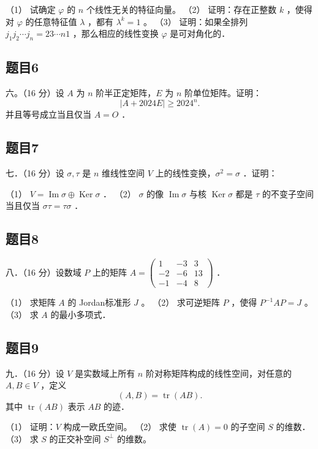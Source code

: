 \documentclass{article}
\begin{document}
（1） 试确定 \(\varphi\) 的 \(n\) 个线性无关的特征向量。
（2） 证明：存在正整数 \(k\) ，使得对 \(\varphi\) 的任意特征值 \(\lambda\) ，都有 \(\lambda^{k}=1\) 。
（3） 证明：如果全排列 \(j_{1} j_{2} \cdots j_{n}=23 \cdots n 1\) ，那么相应的线性变换 \(\varphi\) 是可对角化的．

\subsection{题目6}
六。（16 分）设 \(A\) 为 \(n\) 阶半正定矩阵，\(E\) 为 \(n\) 阶单位矩阵。证明：
\[
|A+2024 E| \geq 2024^{n} .
\]
并且等号成立当且仅当 \(A=O\) ．

\subsection{题目7}
七．（16 分）设 \(\sigma, \tau\) 是 \(n\) 维线性空间 \(V\) 上的线性变换，\(\sigma^{2}=\sigma\) ．证明：

（1） \(V=\operatorname{Im} \sigma \oplus \operatorname{Ker} \sigma\) ．
（2） \(\sigma\) 的像 \(\operatorname{Im} \sigma\) 与核 \(\operatorname{Ker} \sigma\) 都是 \(\tau\) 的不变子空间当且仅当 \(\sigma \tau=\tau \sigma\) ．

\subsection{题目8}
八．（16 分）设数域 \(P\) 上的矩阵 \(A=\left(\begin{array}{ccc}1 & -3 & 3 \\ -2 & -6 & 13 \\ -1 & -4 & 8\end{array}\right)\) ．

（1） 求矩阵 \(A\) 的 Jordan标准形 \(J\) 。
（2） 求可逆矩阵 \(P\) ，使得 \(P^{-1} A P=J\) 。
（3） 求 \(A\) 的最小多项式．

\subsection{题目9}
九．（16 分）设 \(V\) 是实数域上所有 \(n\) 阶对称矩阵构成的线性空间，对任意的 \(A, B \in V\) ，定义
\[
(A, B)=\operatorname{tr}(A B) .
\]
其中 \(\operatorname{tr}(A B)\) 表示 \(A B\) 的迹．

（1） 证明：\(V\) 构成一欧氏空间。
（2） 求使 \(\operatorname{tr}(A)=0\) 的子空间 \(S\) 的维数．
（3） 求 \(S\) 的正交补空间 \(S^{\perp}\) 的维数。
\end{document}
